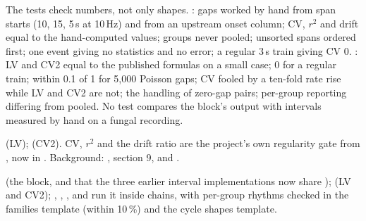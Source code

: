 The tests check numbers, not only shapes. : gaps
worked by hand from span starts (10, 15, 5\,s at 10\,Hz) and from an upstream onset column;
CV, $r^2$ and drift equal to the hand-computed values; groups never pooled; unsorted spans
ordered first; one event giving no statistics and no error; a regular 3\,s train giving CV 0.
: LV and CV2 equal to the published formulas on a small
case; 0 for a regular train; within 0.1 of 1 for 5{,}000 Poisson gaps; CV fooled by a
ten-fold rate rise while LV and CV2 are not; the handling of zero-gap pairs; per-group
reporting differing from pooled. No test compares the block's output with intervals measured
by hand on a fungal recording.

\citet{shinomoto2003differences} (LV); \citet{holt1996comparison} (CV2). CV, $r^2$ and the
drift ratio are the project's own regularity gate from , now in
. Background:
, section 9, and
.

 (the block, and that the three earlier interval
implementations now share ); 
(LV and CV2); ,
, ,
 and  run it inside
chains, with per-group rhythms checked in the families template (within 10\,\%) and the cycle
shapes template.
